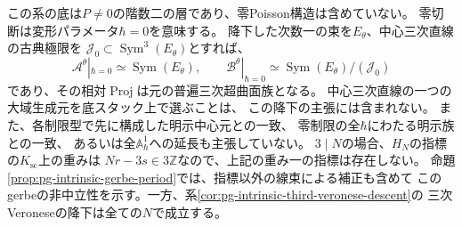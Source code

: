 \begin{remark}[降下の範囲と中心三次直線]
\label{rem:pg-intrinsic-descent-scope}
この系の底は$P\ne0$の階数二の層であり、零Poisson構造は含めていない。
零切断は変形パラメータ$\hbar=0$を意味する。
降下した次数一の束を$E_\theta$、中心三次直線の古典極限を
$\mathcal J_0\subset\operatorname{Sym}^3(E_\theta)$とすれば、
\begin{equation}
 \mathcal A^\theta|_{\hbar=0}\simeq\operatorname{Sym}(E_\theta),
 \qquad
 \mathcal B^\theta|_{\hbar=0}
 \simeq\operatorname{Sym}(E_\theta)/(\mathcal J_0)
 \label{eq:pg-intrinsic-descended-classical-fibre}
\end{equation}
であり、その相対$\operatorname{Proj}$は元の普遍三次超曲面族となる。
中心三次直線の一つの大域生成元を底スタック上で選ぶことは、
この降下の主張には含まれない。
また、各制限型で先に構成した明示中心元との一致、
零制限の全$\hbar$にわたる明示族との一致、
あるいは全$\mathbb A^1_\hbar$への延長も主張していない。
$3\mid N$の場合、$H_N$の指標の$K_{\mathrm{sc}}$上の重みは
$Nr-3s\in3\mathbb Z$なので、上記の重み一の指標は存在しない。
命題\ref{prop:pg-intrinsic-gerbe-period}では、指標以外の線束による補正も含めて
このgerbeの非中立性を示す。一方、系\ref{cor:pg-intrinsic-third-veronese-descent}の
三次Veroneseの降下は全ての$N$で成立する。
\end{remark}

